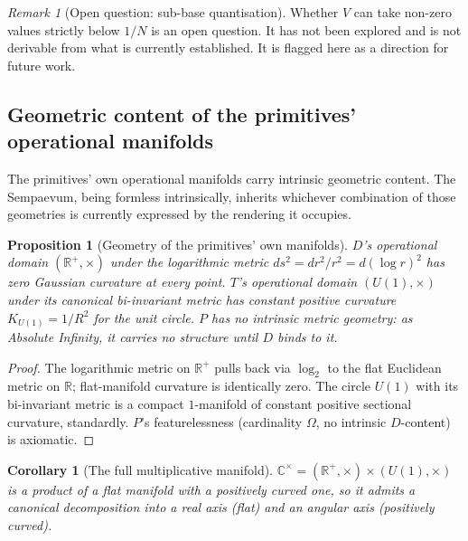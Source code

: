 \documentclass[11pt,a4paper]{article}
\newtheorem{corollary}[theorem]{Corollary}
\newtheorem{proposition}[theorem]{Proposition}
\theoremstyle{definition}
\theoremstyle{remark}
\newtheorem{remark}[theorem]{Remark}
\newcommand{\R}{\mathbb{R}}
\newcommand{\C}{\mathbb{C}}
\begin{document}
\begin{remark}[Open question: sub-base quantisation]\label{rem:subbase-open}
Whether $V$ can take non-zero values strictly below $1/N$ is an open question. It has not been explored and is not derivable from what is currently established. It is flagged here as a direction for future work.
\end{remark}

\subsection{Geometric content of the primitives' operational manifolds}\label{subsec:geometries}

The primitives' own operational manifolds carry intrinsic geometric content. The Sempaevum, being formless intrinsically, inherits whichever combination of those geometries is currently expressed by the rendering it occupies.

\begin{proposition}[Geometry of the primitives' own manifolds]\label{prop:primitive-geometries}
$D$'s operational domain $(\R^{+},\times)$ under the logarithmic metric $ds^{2} = dr^{2}/r^{2} = d(\log r)^{2}$ has zero Gaussian curvature at every point. $T$'s operational domain $(U(1),\times)$ under its canonical bi-invariant metric has constant positive curvature $K_{U(1)} = 1/R^{2}$ for the unit circle. $P$ has no intrinsic metric geometry: as Absolute Infinity, it carries no structure until $D$ binds to it.
\end{proposition}

\begin{proof}
The logarithmic metric on $\R^{+}$ pulls back via $\log_{2}$ to the flat Euclidean metric on $\R$; flat-manifold curvature is identically zero. The circle $U(1)$ with its bi-invariant metric is a compact $1$-manifold of constant positive sectional curvature, standardly. $P$'s featurelessness (cardinality $\Omega$, no intrinsic $D$-content) is axiomatic.
\end{proof}

\begin{corollary}[The full multiplicative manifold]\label{cor:CMinus0}
$\C^{\times} = (\R^{+},\times)\times(U(1),\times)$ is a product of a flat manifold with a positively curved one, so it admits a canonical decomposition into a real axis (flat) and an angular axis (positively curved).
\end{corollary}
\end{document}
